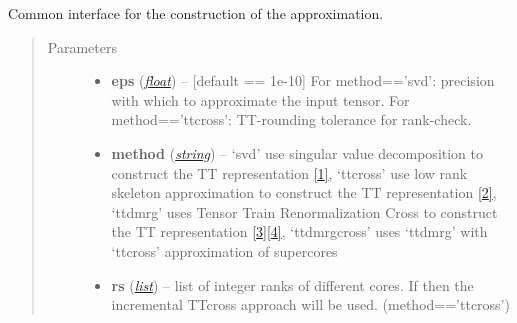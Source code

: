 \documentclass[a4paper,10pt,english]{sphinxmanual}
\begin{document}
\begin{fulllineitems}
\begin{quote}
\begin{description}
\begin{itemize}
\end{itemize}

\end{description}\end{quote}

\begin{fulllineitems}
\label{api-ttvec:TensorToolbox.TTvec.__getitem__}
\end{fulllineitems}


\begin{fulllineitems}
\label{api-ttvec:TensorToolbox.core.TTvec.build}
Common interface for the construction of the approximation.
\begin{quote}\begin{description}
\item[{Parameters}] \leavevmode\begin{itemize}
\item {} 
\textbf{eps} (\href{http://docs.python.org/library/functions.html\#float}{\emph{float}}) -- {[}default == 1e-10{]} For method=='svd': precision with which to approximate the input tensor. For method=='ttcross': TT-rounding tolerance for rank-check.

\item {} 
\textbf{method} (\href{http://docs.python.org/library/string.html\#module-string}{\emph{string}}) -- `svd' use singular value decomposition to construct the TT representation {\hyperref[zrefs:oseledets2011]{{[}1{]}}}, `ttcross' use low rank skeleton approximation to construct the TT representation {\hyperref[zrefs:oseledets2010]{{[}2{]}}}, `ttdmrg' uses Tensor Train Renormalization Cross to construct the TT representation {\hyperref[zrefs:savostyanov2011]{{[}3{]}}}{\hyperref[zrefs:savostyanov2013]{{[}4{]}}}, `ttdmrgcross' uses `ttdmrg' with `ttcross' approximation of supercores

\item {} 
\textbf{rs} (\href{http://docs.python.org/library/functions.html\#list}{\emph{list}}) -- list of integer ranks of different cores. If  then the incremental TTcross approach will be used. (method=='ttcross')


\end{itemize}
\end{description}
\end{quote}
\end{fulllineitems}
\end{fulllineitems}
\end{document}
